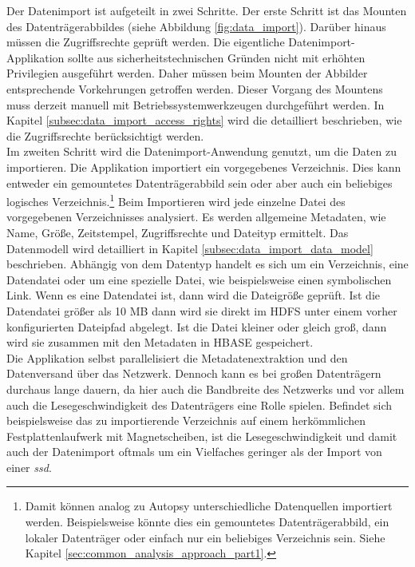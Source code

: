 \noindent
Der Datenimport ist aufgeteilt in zwei Schritte. Der erste Schritt ist das Mounten des Datenträgerabbildes (siehe Abbildung \ref{fig:data_import}). Darüber hinaus müssen die Zugriffsrechte geprüft werden. Die eigentliche Datenimport-Applikation sollte aus sicherheitstechnischen Gründen nicht mit erhöhten Privilegien ausgeführt werden. Daher müssen beim Mounten der Abbilder entsprechende Vorkehrungen getroffen werden. Dieser Vorgang des Mountens muss derzeit manuell mit Betriebssystemwerkzeugen durchgeführt werden. In Kapitel \ref{subsec:data_import_access_rights} wird die detailliert beschrieben, wie die Zugriffsrechte berücksichtigt werden.\\

\noindent
Im zweiten Schritt wird die Datenimport-Anwendung genutzt, um die Daten zu importieren. 
Die Applikation importiert ein vorgegebenes Verzeichnis. Dies kann entweder ein gemountetes Datenträgerabbild sein oder aber auch ein beliebiges logisches Verzeichnis.\footnote{Damit können analog zu Autopsy unterschiedliche Datenquellen importiert werden. Beispielsweise könnte dies ein gemountetes Datenträgerabbild, ein lokaler Datenträger oder einfach nur ein beliebiges Verzeichnis sein. Siehe Kapitel \ref{sec:common_analysis_approach_part1}.} 
Beim Importieren wird jede einzelne Datei des vorgegebenen Verzeichnisses analysiert. Es werden allgemeine Metadaten, wie Name, Größe, Zeitstempel, Zugriffsrechte und Dateityp ermittelt. Das Datenmodell wird detailliert in Kapitel \ref{subsec:data_import_data_model} beschrieben. 
Abhängig von dem Datentyp handelt es sich um ein Verzeichnis, eine Datendatei oder um eine spezielle Datei, wie beispielsweise einen symbolischen Link. Wenn es eine Datendatei ist, dann wird die Dateigröße geprüft. 
Ist die Datendatei größer als 10 MB dann wird sie direkt im HDFS unter einem vorher konfigurierten Dateipfad abgelegt. Ist die Datei kleiner oder gleich groß, dann wird sie zusammen mit den Metadaten in HBASE gespeichert.\\
Die Applikation selbst parallelisiert die Metadatenextraktion und den Datenversand über das Netzwerk. Dennoch kann es bei großen Datenträgern durchaus lange dauern, da hier auch die Bandbreite des Netzwerks und vor allem auch die Lesegeschwindigkeit des Datenträgers eine Rolle spielen. 
Befindet sich beispielsweise das zu importierende Verzeichnis auf einem herkömmlichen Festplattenlaufwerk mit Magnetscheiben, ist die Lesegeschwindigkeit und damit auch der Datenimport oftmals um ein Vielfaches geringer als der Import von einer \textit{\gls{ssd}}.\\ 

